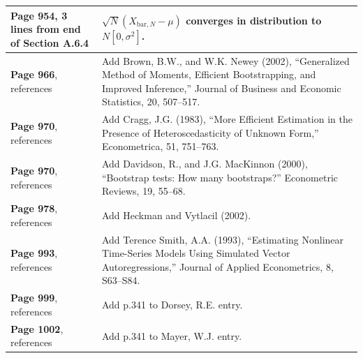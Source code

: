 \documentclass[10pt, a4paper]{article}
\newcommand{\green}[1]{\textcolor{green!50!black}{#1}}
\begin{document}
\begin{longtable}{|R{.41\textwidth}|R{.57\textwidth}|}
	\textbf{Page 954}, 3 lines from end of Section A.6.4 & \green{$\sqrt{N}(X_{\text{bar},N}-\mu)$} converges in distribution to \green{$N[0,\sigma^2]$}. \\ \hline
	\textbf{Page 966}, references & Add \green{Brown, B.W., and W.K. Newey (2002), ``Generalized Method of Moments, Efficient Bootstrapping, and Improved Inference,'' Journal of Business and Economic Statistics, 20, 507--517.} \\ \hline
	\textbf{Page 970}, references & Add \green{Cragg, J.G. (1983), ``More Efficient Estimation in the Presence of Heteroscedasticity of Unknown Form,'' Econometrica, 51, 751--763.} \\ \hline
	\textbf{Page 970}, references & Add \green{Davidson, R., and J.G. MacKinnon (2000), ``Bootstrap tests: How many bootstraps?'' Econometric Reviews, 19, 55--68.} \\ \hline
	\textbf{Page 978}, references & Add \green{Heckman and Vytlacil (2002).} \\ \hline
	\textbf{Page 993}, references & Add \green{Terence Smith, A.A. (1993), ``Estimating Nonlinear Time-Series Models Using Simulated Vector Autoregressions,'' Journal of Applied Econometrics, 8, S63--S84.} \\ \hline
	\textbf{Page 999}, references & Add \green{p.341 to Dorsey, R.E. entry.} \\ \hline
	\textbf{Page 1002}, references & Add \green{p.341 to Mayer, W.J. entry.} \\ \hline
\end{longtable}
\end{document}
